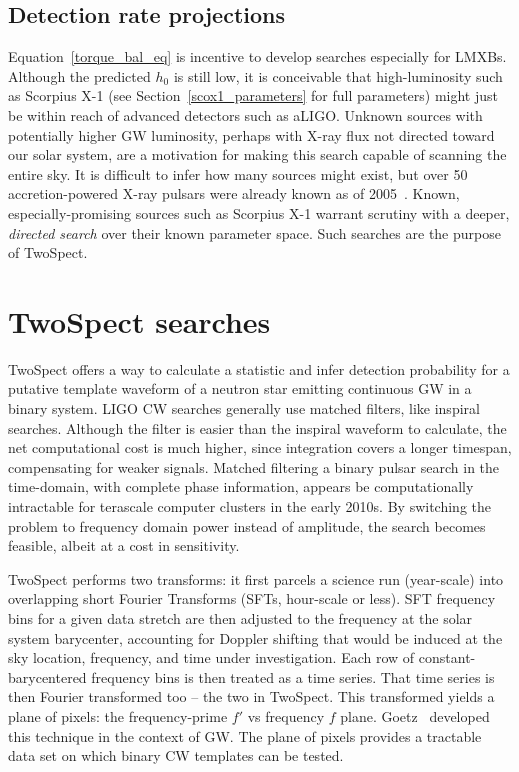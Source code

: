             \subsection{Detection rate projections}
            \label{rate_projections}

Equation~\ref{torque_bal_eq} is incentive to develop searches especially for LMXBs.
Although the predicted $h_0$ is still low, it is conceivable that high-luminosity such as Scorpius X-1 (see Section~\ref{scox1_parameters} for full parameters) might just be within reach of advanced detectors such as aLIGO.
Unknown sources with potentially higher GW luminosity, perhaps with X-ray flux not directed toward our solar system, are a motivation for making this search capable of scanning the entire sky.
It is difficult to infer how many sources might exist, but over 50 accretion-powered X-ray pulsars were already known as of 2005~\cite{ManchesterATNF2005}.
Known, especially-promising sources such as Scorpius X-1 warrant scrutiny with a deeper, \textit{directed search} over their known parameter space.
Such searches are the purpose of TwoSpect.

        \section{TwoSpect searches}
        \label{all-sky}

TwoSpect offers a way to calculate a statistic and infer detection probability for a putative template waveform of a neutron star emitting continuous GW in a binary system.
LIGO CW searches generally use matched filters, like inspiral searches. 
Although the filter is easier than the inspiral waveform to calculate, the net computational cost is much higher, since integration covers a longer timespan, compensating for weaker signals. 
Matched filtering a binary pulsar search in the time-domain, with complete phase information, appears be computationally intractable for terascale computer clusters in the early 2010s. 
By switching the problem to frequency domain power instead of amplitude, the search becomes feasible, albeit at a cost in sensitivity.

TwoSpect performs two transforms: it first parcels a science run (year-scale) into overlapping short Fourier Transforms (SFTs, hour-scale or less).
SFT frequency bins for a given data stretch are then adjusted to the frequency at the solar system barycenter, accounting for Doppler shifting that would be induced at the sky location, frequency, and time under investigation.
Each row of constant-barycentered frequency bins is then treated as a time series.
That time series is then Fourier transformed too -- the two in TwoSpect.
This transformed yields a plane of pixels: the frequency-prime $f'$ vs frequency $f$ plane.
Goetz~\cite{GoetzThesis} developed this technique in the context of GW.
The plane of pixels provides a tractable data set on which binary CW templates can be tested.

